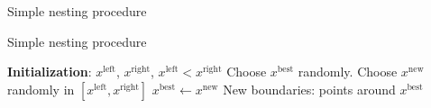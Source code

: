 \begin{frame}{Simple nesting procedure}


\end{frame}

\begin{vbframe}{Simple nesting procedure}

  \begin{algorithmic}
  \State \textbf{Initialization}: $x^{\text{left}}$, $x^{\text{right}}$, $x^{\text{left}} < x^{\text{right}}$
  \State Choose $x^{\text{best}}$ randomly.
    \State Choose $x^{\text{new}}$ randomly in $[x^{\text{left}}, x^{\text{right}}]$
      \State $x^{\text{best}} \leftarrow x^{\text{new}}$
    \EndIf 
    \State New boundaries: points around $x^{\text{best}}$
  \EndFor
  \end{algorithmic}

\end{vbframe}


